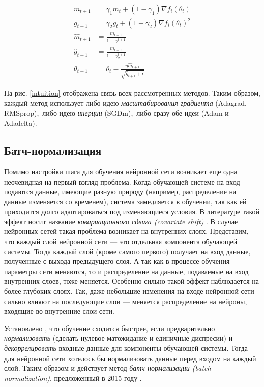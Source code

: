 \documentclass[12pt]{article}
\begin{document}
\begin{equation}
\begin{aligned}
m_{t+1} &= \gamma_1 m_t + (1 - \gamma_1) \nabla f_i(\theta_t)\\
g_{t+1} &= \gamma_2 g_t + (1 - \gamma_2) \nabla f_i(\theta_t)^2\\
\hat{m}_{t+1} &= \frac{m_{t+1}}{1 - \gamma_1^{t+1}}\\
\hat{g}_{t+1} &= \frac{m_{t+1}}{1 - \gamma_2^{t+1}}\\
\theta_{t+1} &= \theta_t - \frac{\eta \hat{m}_{t+1}}{\sqrt{\hat{g}_{t+1} + \epsilon}}
\end{aligned}
\end{equation}

На рис. \ref{intuition} отображена связь всех рассмотренных методов. Таким образом, каждый метод использует либо идею \textit{масштабирования градиента} (Adagrad, RMSprop),\ либо идею \textit{инерции} (SGDm),\ либо сразу обе идеи (Adam и Adadelta).



\subsection{Батч-нормализация}

Помимо настройки шага для обучения нейронной сети возникает еще одна неочевидная на первый взгляд проблема. Когда обучающей системе на вход подаются данные, имеющие разную природу (например, распределение на данные изменяется со временем), система замедляется в обучении, так как ей приходится долго адаптироваться под изменяющиеся условия. В литературе такой эффект носит название \textit{ковариационного сдвига (covariate shift)} \cite{cov_shift}. В случае нейронных сетей такая проблема возникает на внутренних слоях. Представим, что каждый слой нейронной сети --- это отдельная компонента обучающей системы. Тогда каждый слой (кроме самого первого) получает на вход данные, полученные с выхода предыдущего слоя. А так как в процессе обучения параметры сети меняются, то и распределение на данные, подаваемые на вход внутренних слоев, тоже меняется. Особенно сильно такой эффект наблюдается на более глубоких слоях. Так, даже небольшие изменения на входе нейронной сети сильно влияют на последующие слои --- меняется распределение на нейроны, входящие во внутренние слои сети.

Установлено \cite{eff_backprop}, что обучение сходится быстрее, если предварительно \textit{нормализовать} (сделать нулевое матожидание и единичные диспресии) и \textit{декоррелировать} входные данные для компоненты обучающей системы. Тогда для нейронной сети хотелось бы нормализовать данные перед входом на каждый слой. Таким образом и действует метод \textit{батч-нормализации (batch normalization)}, предложенный в 2015 году \cite{BN}.
\end{document}
